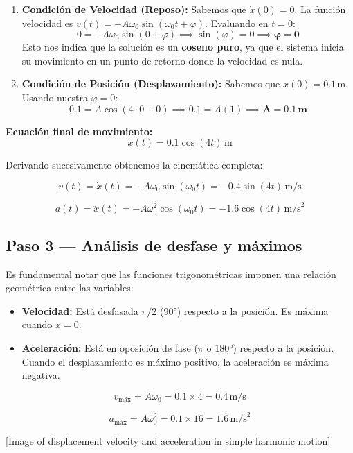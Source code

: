 \documentclass[
  letterpaper,
  DIV=11,
  numbers=noendperiod]{scrreprt}
\providecommand{\tightlist}{%
  \setlength{\itemsep}{0pt}\setlength{\parskip}{0pt}}
\begin{document}
\begin{enumerate}
\def\labelenumi{\arabic{enumi}.}
\item
  \textbf{Condición de Velocidad (Reposo):} Sabemos que
  \(\dot{x}(0) = 0\). La función velocidad es
  \(v(t) = -A\omega_0\sin(\omega_0 t + \varphi)\). Evaluando en \(t=0\):
  \[0 = -A\omega_0\sin(0 + \varphi) \implies \sin(\varphi) = 0 \implies \mathbf{\varphi = 0}\]
  Esto nos indica que la solución es un \textbf{coseno puro}, ya que el
  sistema inicia su movimiento en un punto de retorno donde la velocidad
  es nula.
\item
  \textbf{Condición de Posición (Desplazamiento):} Sabemos que
  \(x(0) = 0.1\,\text{m}\). Usando nuestra \(\varphi = 0\):
  \[0.1 = A\cos(4 \cdot 0 + 0) \implies 0.1 = A(1) \implies \mathbf{A = 0.1\,\text{m}}\]
\end{enumerate}

\textbf{Ecuación final de movimiento:} \[x(t) = 0.1\cos(4t)\,\text{m}\]

Derivando sucesivamente obtenemos la cinemática completa:

\[
v(t) = \dot{x}(t) = -A\omega_0\sin(\omega_0 t) = -0.4\sin(4t)\,\text{m/s}
\]

\[
a(t) = \ddot{x}(t) = -A\omega_0^2\cos(\omega_0 t) = -1.6\cos(4t)\,\text{m/s}^2
\]

\subsection{Paso 3 --- Análisis de desfase y
máximos}\label{paso-3-anuxe1lisis-de-desfase-y-muxe1ximos}

Es fundamental notar que las funciones trigonométricas imponen una
relación geométrica entre las variables:

\begin{itemize}
\tightlist
\item
  \textbf{Velocidad:} Está desfasada \(\pi/2\) (90°) respecto a la
  posición. Es máxima cuando \(x=0\).
\item
  \textbf{Aceleración:} Está en oposición de fase (\(\pi\) o 180°)
  respecto a la posición. Cuando el desplazamiento es máximo positivo,
  la aceleración es máxima negativa.
\end{itemize}

\[
v_\text{máx} = A\omega_0 = 0.1 \times 4 = 0.4\,\text{m/s}
\]

\[
a_\text{máx} = A\omega_0^2 = 0.1 \times 16 = 1.6\,\text{m/s}^2
\]

{[}Image of displacement velocity and acceleration in simple harmonic
motion{]}
\end{document}

